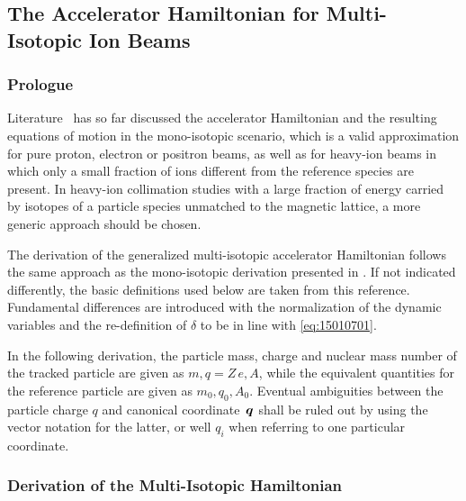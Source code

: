 \subsection{The Accelerator Hamiltonian for Multi-Isotopic Ion Beams}
\subsubsection{Prologue}

Literature~\cite{DESY-85-084,DESY-87-036,CERN-SL-95-12,DESY-95-189,wolski2014beam} has so far discussed the accelerator Hamiltonian and the resulting equations of motion in the mono-isotopic scenario, which is a valid approximation for pure proton, electron or positron beams, as well as for heavy-ion beams in which only a small fraction of ions different from the reference species are present. In heavy-ion collimation studies with a large fraction of energy carried by isotopes of a particle species unmatched to the magnetic lattice, a more generic approach should be chosen.

The derivation of the generalized multi-isotopic accelerator Hamiltonian follows the same approach as the mono-isotopic derivation presented in \cite{ProceedingsCAS1995}. If not indicated differently, the basic definitions used below are taken from this reference. Fundamental differences are introduced with the normalization of the dynamic variables and the re-definition of $\delta$ to be in line with \eqref{eq:15010701}.

In the following derivation, the particle mass, charge and nuclear mass number of the tracked particle are given as $m,q=Z\,e, A$, while the equivalent quantities for the reference particle are given as $m_0,q_0,A_0$. Eventual ambiguities between the particle charge $q$ and canonical \mbox{coordinate $\boldsymbol{q}$} shall be ruled out by using the vector notation for the latter, or well $q_i$ when referring to one particular coordinate.

\subsubsection{Derivation of the Multi-Isotopic Hamiltonian}

